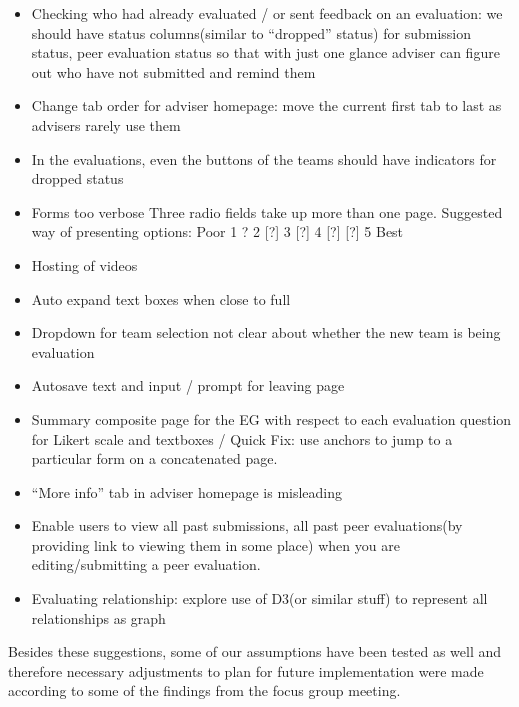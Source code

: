 \begin{itemize}
  \item Checking who had already evaluated / or sent feedback on an evaluation: we should have status columns(similar to ``dropped'' status) for submission status, peer evaluation status so that with just one glance adviser can figure out who have not submitted and remind them
  \item Change tab order for adviser homepage: move the current first tab to last as advisers rarely use them
  \item In the evaluations, even the buttons of the teams should have indicators for dropped status
  \item Forms too verbose Three radio fields take up more than one page. Suggested way of presenting options: Poor 1 ? 2 [?] 3 [?] 4 [?] [?] 5 Best
  \item Hosting of videos
  \item Auto expand text boxes when close to full
  \item Dropdown for team selection not clear about whether the new team is being evaluation
  \item Autosave text and input / prompt for leaving page
  \item Summary composite page for the EG with respect to each evaluation question for Likert scale and textboxes / Quick Fix: use anchors to jump to a particular form on a concatenated page.
  \item ``More info'' tab in adviser homepage is misleading
  \item Enable users to view all past submissions, all past peer evaluations(by providing link to viewing them in some place) when you are editing/submitting a peer evaluation.
  \item Evaluating relationship: explore use of D3(or similar stuff) to represent all relationships as graph
\end{itemize}

Besides these suggestions, some of our assumptions have been tested as well and therefore necessary adjustments to plan for future implementation were made according to some of the findings from the focus group meeting.
